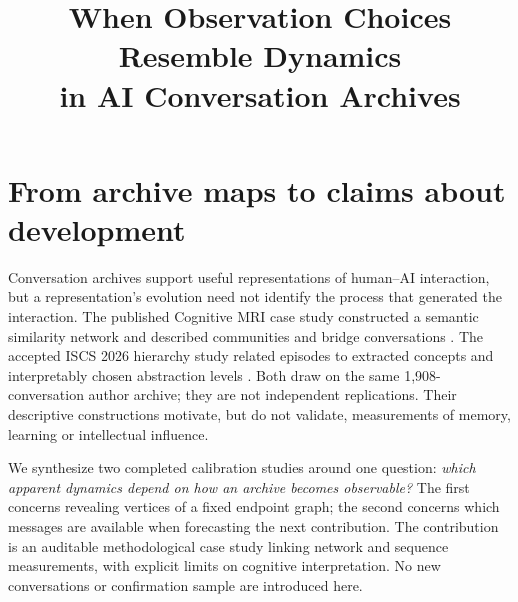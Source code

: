 \documentclass{iscs}
\begin{document}
\title{When Observation Choices Resemble Dynamics\\in AI Conversation Archives}
\maketitle\unskip\par

\section{From archive maps to claims about development}
Conversation archives support useful representations of human--AI interaction,
but a representation's evolution need not identify the process that generated
the interaction. The published Cognitive MRI case study constructed a semantic
similarity network and described communities and bridge conversations
\cite{towell2026cmri}. The accepted ISCS 2026 hierarchy study related episodes
to extracted concepts and interpretably chosen abstraction levels
\cite{towell2026hierarchy}. Both draw on the same 1,908-conversation author
archive; they are not independent replications. Their descriptive constructions
motivate, but do not validate, measurements of memory, learning or intellectual
influence.

We synthesize two completed calibration studies around one question:
\emph{which apparent dynamics depend on how an archive becomes observable?}
The first concerns revealing vertices of a fixed endpoint graph; the second
concerns which messages are available when forecasting the next contribution.
The contribution is an auditable methodological case study linking network and
sequence measurements, with explicit limits on cognitive interpretation.
No new conversations or confirmation sample are introduced here.
\end{document}
